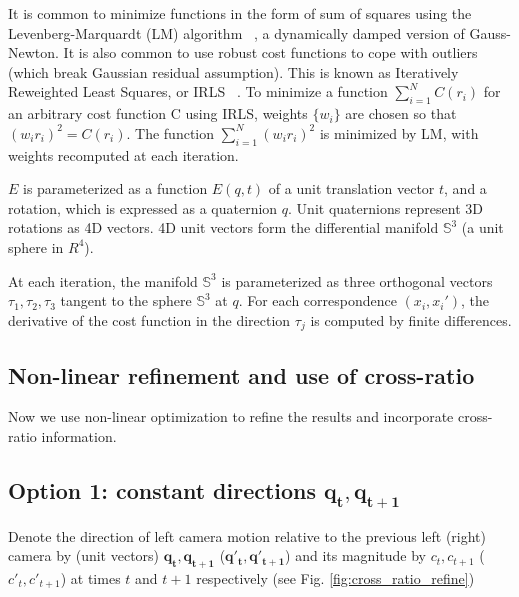 \documentclass[10pt]{article}         %
\begin{document}
It is common to minimize functions in the form of sum of squares using
the Levenberg-Marquardt (LM) algorithm ~\cite{marquardt1963algorithm},
a dynamically damped version of Gauss-Newton.  It is also common to
use robust cost functions to cope with outliers (which break Gaussian
residual assumption).  This is known as Iteratively Reweighted Least
Squares, or IRLS ~\cite{Hartley2004}.  To minimize a function
$\sum_{i=1}^N C(r_i)$ for an arbitrary cost function C using IRLS,
weights $\{w_i\}$ are chosen so that $(w_ir_i)^2=C(r_i)$. The function
$\sum_{i=1}^N (w_ir_i)^2$ is minimized by LM, with weights recomputed
at each iteration.

$E$ is parameterized as a function $E(q,t)$ of a unit translation
vector $t$, and a rotation, which is expressed as a quaternion
$q$. Unit quaternions represent 3D rotations as 4D vectors. 4D unit
vectors form the differential manifold $\mathbb{S}^3$ (a unit sphere
in $R^4$).

At each iteration, the manifold $\mathbb{S}^3$ is parameterized as
three orthogonal vectors $\tau_1,\tau_2,\tau_3$ tangent to the sphere
$\mathbb{S}^3$ at $q$.  For each correspondence $(x_i,x_i')$, the
derivative of the cost function in the direction $\tau_j$ is computed
by finite differences.

\subsection{Non-linear refinement and use of cross-ratio}
Now we use non-linear optimization to refine the results and
incorporate cross-ratio information.

\subsection{Option 1: constant directions $\mathbf{q_t}, \mathbf{q_{t+1}}$}

Denote the direction of left camera motion relative to the previous
left (right) camera by (unit vectors) $\mathbf{q_t},\mathbf{q_{t+1}}$
($\mathbf{q'_t},\mathbf{q'_{t+1}}$) and its magnitude by $c_t,c_{t+1}$
($c'_t,c'_{t+1}$) at times $t$ and $t+1$ respectively (see
Fig. \ref{fig:cross_ratio_refine})
\end{document}
